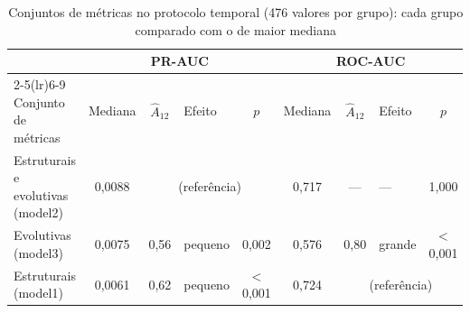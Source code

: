 \begin{table}[htbp]
    
    \centering
    \scriptsize
    \setlength{\tabcolsep}{3pt}%
    \caption{Conjuntos de métricas no protocolo temporal (476 valores por grupo): cada grupo comparado com o de maior mediana}
    \label{tab:res-a12-fatores-conjunto}
    \begin{tabular}{lcclc|cclc}
        \toprule
         & \multicolumn{4}{c|}{PR-AUC} & \multicolumn{4}{c}{ROC-AUC} \\
        \cmidrule(lr){2-5}\cmidrule(lr){6-9}
        Conjunto de métricas & Mediana & $\hat{A}_{12}$ & Efeito & $p$ & Mediana & $\hat{A}_{12}$ & Efeito & $p$ \\
        \midrule
        Estruturais e evolutivas (model2) & 0,0088 & \multicolumn{3}{c}{(referência)} & 0,717 & --- & --- & 1,000 \\
        Evolutivas (model3) & 0,0075 & 0,56 & pequeno & 0,002 & 0,576 & 0,80 & grande & $<$ 0,001 \\
        Estruturais (model1) & 0,0061 & 0,62 & pequeno & $<$ 0,001 & 0,724 & \multicolumn{3}{c}{(referência)} \\
        \bottomrule
    \end{tabular}
\end{table}%
